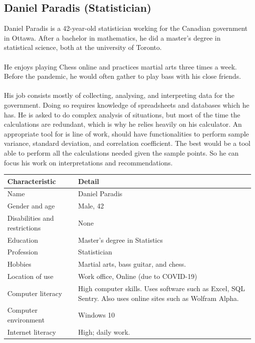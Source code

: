 \documentclass[11pt,onside]{report}
\begin{document}
\subsection{Daniel Paradis (Statistician)}
\begin{description}
Daniel Paradis is a 42-year-old statistician working for the Canadian government in Ottawa. After a bachelor in mathematics, he did a master’s degree in statistical science, both at the university of Toronto. \\ \\

He enjoys playing Chess online and practices martial arts three times a week. Before the pandemic, he would often gather to play bass with his close friends.  \\ \\

His job consists mostly of collecting, analysing, and interpreting data for the government. Doing so requires knowledge of spreadsheets and databases which he has. He is asked to do complex analysis of situations, but most of the time the calculations are redundant, which is why he relies heavily on his calculator. An appropriate tool for is line of work, should have functionalities to perform sample variance, standard deviation, and correlation coefficient. The best would be a tool able to perform all the calculations needed given the sample points. So he can focus his work on interpretations and recommendations.
\end{description}
\begin{center}
    \begin{tabular}{|p{4cm}|p{10cm}|}
        \hline
        \bf{Characteristic} & \bf{Detail} \\
        \hline
        Name &   Daniel Paradis \\
        \hline
        Gender and age & Male, 42 \\
        \hline
        Disabilities and restrictions & None \\
        \hline
        Education & Master's degree in Statistics \\
        \hline
        Profession & Statistician \\
        \hline
        Hobbies & Martial arts, bass guitar, and chess. \\
        \hline
        Location of use & Work office, Online (due to COVID-19) \\
        \hline
        Computer literacy & High computer skills. Uses software such as Excel, SQL Sentry. Also uses online sites such as Wolfram Alpha. \\
        \hline
        Computer environment &  Windows 10 \\
        \hline
        Internet literacy &  High; daily work. \\
        \hline
    \end{tabular}
\end{center}
\end{document}
